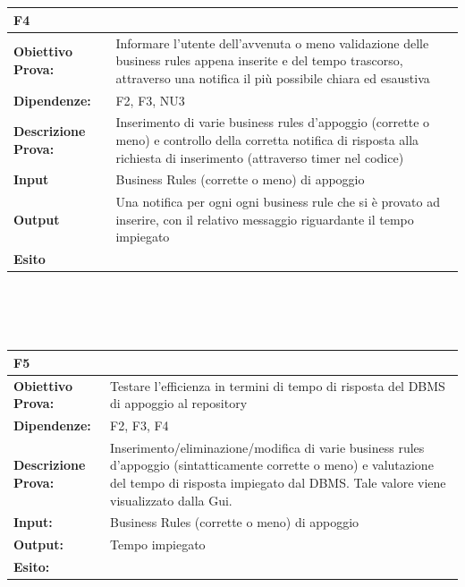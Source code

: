 \documentclass[11pt,titlepage,a4paper]{report}
\begin{document}
\\
\\

\begin{tabular}{||p{4.5cm}||p{7.5cm}||}
\hline
\textbf{\textsf{F4}}& \\
\hline
{\textbf {Obiettivo Prova:}}& Informare l'utente dell'avvenuta o meno validazione delle business rules appena inserite e del tempo trascorso, attraverso una notifica il pi\`u possibile chiara ed esaustiva\\ \hline
{\textbf{Dipendenze:}} & F2, F3, NU3 \\ \hline
{\textbf{Descrizione Prova:}}& Inserimento di varie business rules d'appoggio (corrette o meno) e controllo della corretta notifica di risposta alla richiesta di inserimento (attraverso timer nel codice) \\ \hline
{\textbf{Input}}& Business Rules (corrette o meno) di appoggio  \\ \hline
{\textbf{Output}}& Una notifica per ogni ogni business rule che si \`e provato ad inserire, con il relativo messaggio riguardante il tempo impiegato \\ \hline
{\textbf{Esito}}&   \\ \hline
\end{tabular} \\
\\
\\
\begin{tabular}{||p{4.5cm}||p{7.5cm}||}
\hline
\textbf{\textsf{F5}}& \\
\hline
{\textbf {Obiettivo Prova:}}& Testare l'efficienza in termini di tempo di risposta del DBMS di appoggio al repository \\ \hline
{\textbf{Dipendenze:}}& F2, F3, F4\\ \hline
{\textbf{Descrizione Prova:}}& Inserimento/eliminazione/modifica di varie business rules d'appoggio (sintatticamente corrette o meno) e valutazione del tempo di risposta impiegato dal DBMS. Tale valore viene visualizzato dalla Gui. \\ \hline
{\textbf{Input:}}& Business Rules (corrette o meno) di appoggio  \\ \hline
{\textbf{Output:}}& Tempo impiegato \\ \hline
{\textbf{Esito:}}&  \\ \hline
\end{tabular} \\
\\
\\
\end{document}
